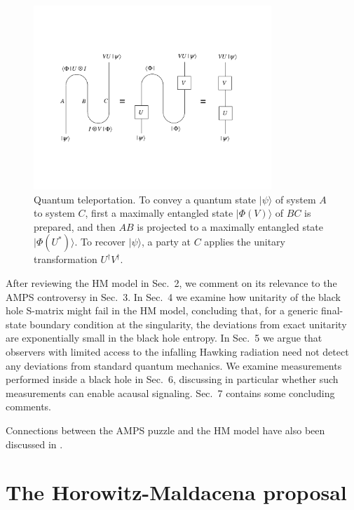 \documentclass[11pt]{article}
\begin{document}
\begin{figure}[t]
\begin{center}
\includegraphics[width=0.8\textwidth]{teleport.pdf}
\end{center}
\caption{Quantum teleportation. To convey a quantum state $|\psi\rangle$ of system $A$ to system $C$, first a maximally entangled state $|\Phi(V)\rangle$ of $BC$ is prepared, and then $AB$ is projected to a maximally entangled state $|\Phi(U^*)\rangle$. To recover $|\psi\rangle$, a party at $C$ applies the unitary transformation $U^\dagger V^\dagger$.}
\label{fig:teleport}
\end{figure}

After reviewing the HM model in Sec.~2, we comment on its relevance to the AMPS controversy in Sec.~3. In Sec.~4 we examine how unitarity of the black hole S-matrix might fail in the HM model, concluding that, for a generic final-state boundary condition at the singularity, the deviations from exact unitarity are exponentially small in the black hole entropy. In Sec.~5 we argue that observers with limited access to the infalling Hawking radiation need not detect any deviations from standard quantum mechanics. We examine measurements performed inside a black hole in Sec.~6, discussing in particular whether such measurements can enable acausal signaling. Sec.~7 contains some concluding comments.

Connections between the AMPS puzzle and the HM model have also been discussed in \cite{verlinde,bousso,bousso-stanford,rangamani}.

\section{The Horowitz-Maldacena proposal}
\end{document}
